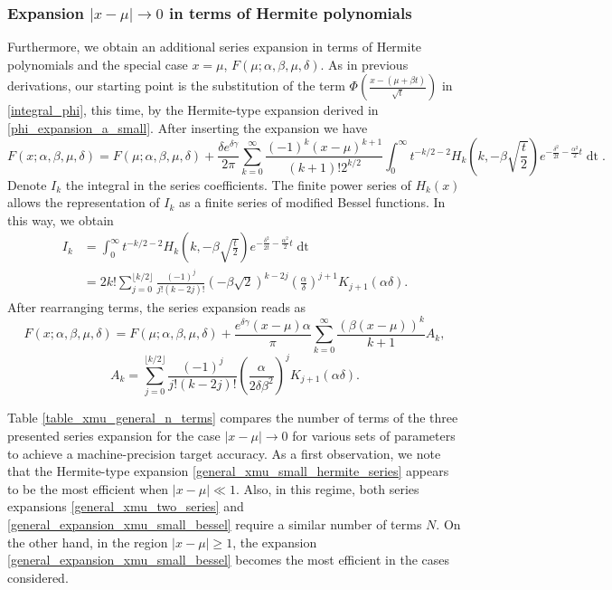 \documentclass[10pt,a4paper,oneside]{article}
\numberwithin{equation}{section}
\begin{document}
\subsubsection{Expansion $|x-\mu| \to 0$ in terms of Hermite polynomials}
Furthermore, we obtain an additional series expansion in terms of Hermite polynomials and the special case $x=\mu$, $F(\mu; \alpha, \beta, \mu, \delta)$. As in previous derivations, our starting point is the substitution of the term $\Phi\left(\frac{x - (\mu +\beta t)}{\sqrt{t}}\right)$ in \eqref{integral_phi}, this time,
by the Hermite-type expansion derived in \eqref{phi_expansion_a_small}. After inserting the expansion we have
\begin{equation}
F(x; \alpha, \beta, \mu, \delta) = F(\mu; \alpha, \beta, \mu, \delta) + \frac{\delta e^{\delta \gamma}}{2\pi} \sum_{k=0}^{\infty}\frac{(-1)^k (x-\mu)^{k+1}}{(k + 1)! 2^{k/2}}\int_0^{\infty} t^{-k/2 - 2} H_k\left(k, -\beta\sqrt{\frac{t}{2}}\right) e^{-\frac{\delta^2}{2t} - \frac{\alpha^2}{2}t} \mathop{dt}.
\end{equation}
Denote $I_k$ the integral in the series coefficients. The finite power series of $H_k(x)$ \cite[\S 18.5.13]{NIST:DLMF} allows the representation of $I_k$ as a finite series of modified Bessel functions. In this way, we obtain
\begin{align}
I_k  &= \int_0^{\infty} t^{-k/2 - 2} H_k\left(k, -\beta\sqrt{\frac{t}{2}}\right) e^{-\frac{\delta^2}{2t} - \frac{\alpha^2}{2}t} \mathop{dt}\\
&= 2k! \sum_{j=0}^{\lfloor k/2 \rfloor} \frac{(-1)^j}{j!(k - 2j)!} (-\beta\sqrt{2})^{k - 2j} \left(\frac{\alpha}{\delta}\right)^{j+1} K_{j+1}(\alpha \delta).
\end{align}
After rearranging terms, the series expansion reads as
\begin{equation}\label{general_xmu_small_hermite_series}
F(x; \alpha, \beta, \mu, \delta) = F(\mu; \alpha, \beta, \mu, \delta) + \frac{e^{\delta \gamma} (x-\mu) \alpha}{\pi} \sum_{k=0}^{\infty} \frac{(\beta(x-\mu))^k}{k+1}A_k,
\end{equation}
\begin{equation}
A_k = \sum_{j=0}^{\lfloor k/2 \rfloor} \frac{(-1)^j}{j!(k - 2j)!} \left(\frac{\alpha}{2\delta \beta^2}\right)^j K_{j+1}(\alpha \delta).
\end{equation}

Table \ref{table_xmu_general_n_terms} compares the number of terms of the three presented series expansion for the case $|x-\mu| \to 0$ for various sets of parameters to achieve a machine-precision target accuracy. As a first observation, we note that the Hermite-type expansion \eqref{general_xmu_small_hermite_series} appears to be the most efficient when $|x-\mu| \ll 1$. Also, in this regime, both series expansions \eqref{general_xmu_two_series} and \eqref{general_expansion_xmu_small_bessel} require a similar number of terms $N$. On the other hand, in the region $|x-\mu| \ge 1$, the expansion \eqref{general_expansion_xmu_small_bessel} becomes the most efficient in the cases considered. 
\end{document}
